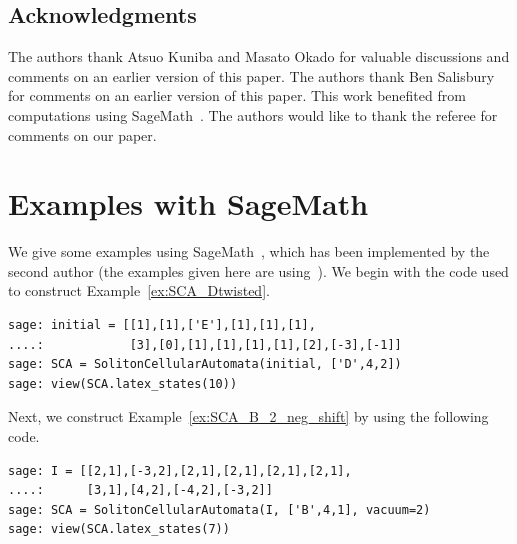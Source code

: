 \documentclass[reqno]{amsart}
\theoremstyle{plain}
\theoremstyle{definition}
\numberwithin{equation}{section}
\begin{document}
\subsection*{Acknowledgments}

The authors thank Atsuo Kuniba and Masato Okado for valuable discussions and comments on an earlier version of this paper.
The authors thank Ben Salisbury for comments on an earlier version of this paper.
This work benefited from computations using {\sc SageMath}~\cite{sage, combinat}.
The authors would like to thank the referee for comments on our paper.






\appendix
\section{Examples with {\sc SageMath}}

We give some examples using {\sc SageMath}~\cite{sage}, which has been implemented by the second author (the examples given here are using~\cite{ScrimshawSCACode}).
We begin with the code used to construct Example~\ref{ex:SCA_Dtwisted}.

\begin{lstlisting}
sage: initial = [[1],[1],['E'],[1],[1],[1],
....:            [3],[0],[1],[1],[1],[1],[2],[-3],[-1]]
sage: SCA = SolitonCellularAutomata(initial, ['D',4,2])
sage: view(SCA.latex_states(10))
\end{lstlisting}

%
%
Next, we construct Example~\ref{ex:SCA_B_2_neg_shift} by using the following code.

\begin{lstlisting}
sage: I = [[2,1],[-3,2],[2,1],[2,1],[2,1],[2,1],
....:      [3,1],[4,2],[-4,2],[-3,2]]
sage: SCA = SolitonCellularAutomata(I, ['B',4,1], vacuum=2)
sage: view(SCA.latex_states(7))
\end{lstlisting}
\end{document}
